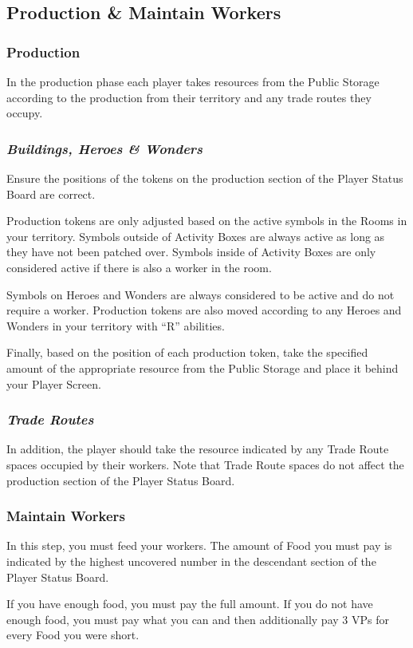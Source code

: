 \documentclass[10pt,twocolumn]{article}
\begin{document}
\subsection{Production \& Maintain Workers}
\subsubsection{Production}
In the production phase each player takes resources from the Public Storage according to the production from their territory and any trade routes they occupy.

\subsubsection*{\textit{Buildings, Heroes \& Wonders}}
Ensure the positions of the tokens on the production section of the Player Status Board are correct.

Production tokens are only adjusted based on the active symbols in the Rooms in your territory. Symbols outside of Activity Boxes are always active as long as they have not been patched over. Symbols inside of Activity Boxes are only considered active if there is also a worker in the room.

Symbols on Heroes and Wonders are always considered to be active and do not require a worker. Production tokens are also moved according to any Heroes and Wonders in your territory with ``R'' abilities.

Finally, based on the position of each production token, take the specified amount of the appropriate resource from the Public Storage and place it behind your Player Screen.

\subsubsection*{\textit{Trade Routes}}
In addition, the player should take the resource indicated by any Trade Route spaces occupied by their workers. Note that Trade Route spaces do not affect the production section of the Player Status Board.

\subsubsection{Maintain Workers}
In this step, you must feed your workers. The amount of Food you must pay is indicated by the highest uncovered number in the descendant section of the Player Status Board.

If you have enough food, you must pay the full amount. If you do not have enough food, you must pay what you can and then additionally pay 3 VPs for every Food you were short.
\end{document}
